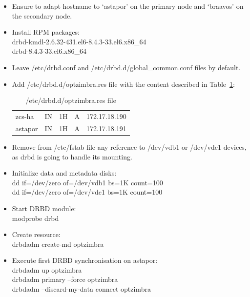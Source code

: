 \documentclass[a4paper, 12pt]{book}
\begin{document}
\begin{itemize}
	\item Ensure to adapt hostname to `astapor' on the primary node and `braavos' on the secondary node.
	
	\item Install RPM packages:\\
			drbd-kmdl-2.6.32-431.el6-8.4.3-33.el6.x86\_64\\
			drbd-8.4.3-33.el6.x86\_64
	
	\item Leave /etc/drbd.conf and /etc/drbd.d/global\_common.conf files by default.
	
	\item Add /etc/drbd.d/optzimbra.res file with the content described in Table~\ref{table:resource}:

\FloatBarrier
\begin{table}[H]
  \centering
  \begin{tabular}{ | l l l l l | }
    \hline
      zcs-ha          & IN & 1H & A     & 172.17.18.190\\
      astapor         & IN & 1H & A     & 172.17.18.191\\
    \hline
  \end{tabular}
\caption{/etc/drbd.d/optzimbra.res file}
\label{table:resource}
\end{table}
	
	\item Remove from /etc/fstab file any reference to /dev/vdb1 or /dev/vdc1 devices, as drbd is going to handle its mounting.
	
	\item Initialize data and metadata disks:\\
		\indent dd if=/dev/zero of=/dev/vdb1 bs=1K count=100\\
		\indent dd if=/dev/zero of=/dev/vdc1 bs=1K count=100
	
	\item Start DRBD module:\\
		modprobe drbd
	
	\item Create resource:\\
		drbdadm create-md optzimbra
	
	\item Execute first DRBD synchronisation on astapor:\\
		drbdadm up optzimbra\\
		drbdadm primary --force optzimbra\\
		drbdadm --discard-my-data connect optzimbra


\end{itemize}
\end{document}
